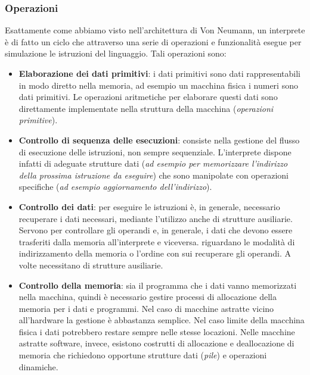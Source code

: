 \documentclass[oneside,a4paper,11pt]{book}
\theoremstyle{italicstyle}
\theoremstyle{normStyle}
\begin{document}
\subsubsection{Operazioni}
Esattamente come abbiamo visto nell'architettura di Von Neumann, 
un interprete è di fatto un ciclo che attraverso una serie di operazioni 
e funzionalità esegue per simulazione le istruzioni del linguaggio. Tali operazioni sono:
\begin{itemize}
  \item \textbf{Elaborazione dei dati primitivi}: i dati primitivi sono 
  dati rappresentabili in modo diretto nella memoria, ad esempio un macchina 
  fisica i numeri sono dati primitivi. Le operazioni aritmetiche per 
  elaborare questi dati sono direttamente implementate nella struttura della 
  macchina (\textit{operazioni primitive}).
  \item \textbf{Controllo di sequenza delle esecuzioni}: consiste nella gestione 
  del flusso di esecuzione delle istruzioni, non sempre sequenziale. L'interprete 
  dispone infatti di adeguate strutture dati (\textit{ad esempio per 
  memorizzare l'indirizzo della prossima istruzione da eseguire}) che sono manipolate 
  con operazioni specifiche (\textit{ad esempio aggiornamento dell'indirizzo}).
  \item \textbf{Controllo dei dati}: per eseguire le istruzioni è, in 
  generale, necessario recuperare i dati necessari, mediante l'utilizzo anche 
  di strutture ausiliarie. Servono per controllare gli operandi e, in 
  generale, i dati che devono essere trasferiti dalla memoria all'interprete 
  e viceversa. riguardano le modalità di indirizzamento della memoria o l'ordine con sui 
  recuperare gli operandi. A volte necessitano di strutture ausiliarie.
  \item \textbf{Controllo della memoria}: sia il programma che i dati vanno memorizzati nella macchina,
  quindi è necessario gestire processi di allocazione della memoria per i dati e 
  programmi. Nel caso di macchine astratte vicino all'hardware la gestione è abbastanza 
  semplice. Nel caso limite della macchina fisica i dati potrebbero 
  restare sempre nelle stesse locazioni. Nelle macchine astratte software, invece, esistono 
  costrutti di allocazione e deallocazione di memoria che richiedono opportune strutture dati
  (\textit{pile}) e operazioni dinamiche.
\end{itemize}
\end{document}
